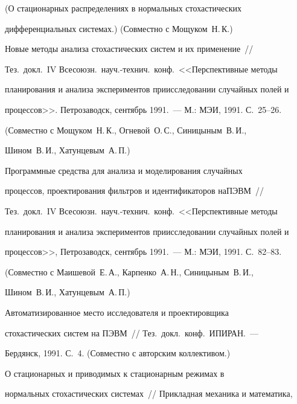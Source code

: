 (О стационарных распределениях в нормальных стохастических


дифференциальных системах.) (Совместно с Мощуком~Н.\,К.)





 Новые методы анализа стохастических систем и их применение~//


Тез.\ докл.\ IV Всесоюзн.\ науч.-технич.\ конф.\ <<Перспективные методы


планирования и анализа экспериментов при\linebreak исследовании случайных полей и


процессов>>. Петрозаводск, сентябрь 1991.~--- М.: МЭИ, 1991. С.~25--26.


(Совместно с Мощуком~Н.\,К., Огневой~О.\,С., Синицыным~В.\,И.,


Шином~В.\,И., Хатунцевым~А.\,П.)





 Программные средства для анализа и моделирования случайных


процессов, проектирования фильтров и идентификаторов на\linebreak ПЭВМ~//


Тез.\ докл.\ IV Всесоюзн.\ науч.-технич.\ конф.\ <<Перспективные методы


планирования и анализа экспериментов при\linebreak исследовании случайных полей и


процессов>>, Петрозаводск, сентябрь 1991.~--- М.: МЭИ, 1991. С.~82--83.


(Совместно с Маи\-ше\-вой~Е.\,А., Карпенко~А.\,Н., Синицыным~В.\,И.,


Шином~В.\,И., Хатунцевым~А.\,П.)





 Автоматизированное место исследователя и проектировщика


стохастических систем на ПЭВМ~// Тез.\ докл.\ конф.\ ИПИ\linebreak РАН.~---


Бердянск, 1991. С.~4. (Совместно с авторским кол\-лек\-тивом.)





 О стационарных и приводимых к стационарным режимах в


нормальных стохастических системах~// Прикладная механика и математика,


